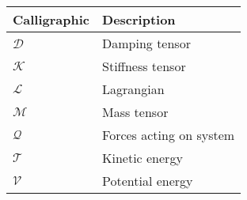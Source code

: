 \begin{spacing}{0.9}
\begin{multicols}{2}
\begin{table}[H]
\begin{tabular}{p{1.5cm} p{5cm}}
    \end{tabular}
\end{table}

\begin{table}[H]
\centering
    \begin{tabular}{p{2.5cm} p{4cm}} \hline
    \textbf{Calligraphic}    &   \textbf{Description }\\ \hline

    $\mathcal{D}$     &  Damping tensor \\
    $\mathcal{K}$     &  Stiffness tensor \\
    $\mathcal{L}$     &  Lagrangian \\
    $\mathcal{M}$     &  Mass tensor \\
    $\mathcal{Q}$     &  Forces acting on system \\
    $\mathcal{T}$     &  Kinetic energy \\
    $\mathcal{V}$     &  Potential energy \\

    
    \end{tabular}
\end{table}





\end{multicols}
\end{spacing}
